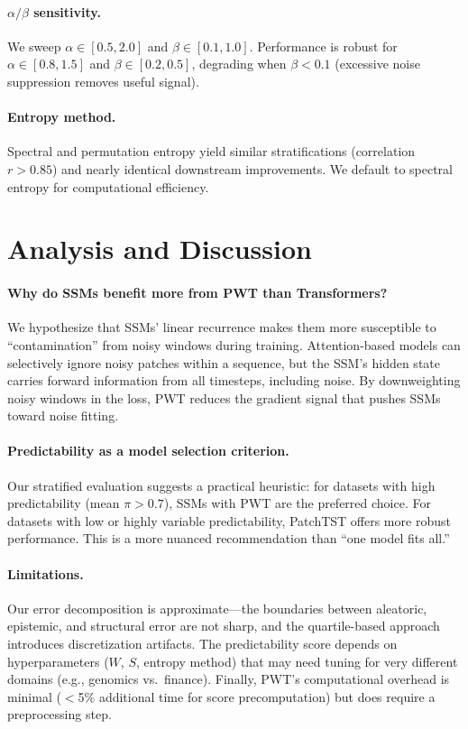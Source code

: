 \documentclass[10pt]{article}
\newcommand{\pwt}{\textsc{PWT}}
\newcommand{\predscore}{\pi}
\begin{document}
\paragraph{$\alpha/\beta$ sensitivity.} We sweep $\alpha \in [0.5, 2.0]$ and $\beta \in [0.1, 1.0]$. Performance is robust for $\alpha \in [0.8, 1.5]$ and $\beta \in [0.2, 0.5]$, degrading when $\beta < 0.1$ (excessive noise suppression removes useful signal).

\paragraph{Entropy method.} Spectral and permutation entropy yield similar stratifications (correlation $r > 0.85$) and nearly identical downstream improvements. We default to spectral entropy for computational efficiency.

\section{Analysis and Discussion}
\label{sec:discussion}

\paragraph{Why do SSMs benefit more from \pwt{} than Transformers?}
We hypothesize that SSMs' linear recurrence makes them more susceptible to ``contamination'' from noisy windows during training. Attention-based models can selectively ignore noisy patches within a sequence, but the SSM's hidden state carries forward information from all timesteps, including noise. By downweighting noisy windows in the loss, \pwt{} reduces the gradient signal that pushes SSMs toward noise fitting.

\paragraph{Predictability as a model selection criterion.}
Our stratified evaluation suggests a practical heuristic: for datasets with high predictability (mean $\predscore > 0.7$), SSMs with \pwt{} are the preferred choice. For datasets with low or highly variable predictability, PatchTST offers more robust performance. This is a more nuanced recommendation than ``one model fits all.''

\paragraph{Limitations.}
Our error decomposition is approximate---the boundaries between aleatoric, epistemic, and structural error are not sharp, and the quartile-based approach introduces discretization artifacts. The predictability score depends on hyperparameters ($W$, $S$, entropy method) that may need tuning for very different domains (e.g., genomics vs.\ finance). Finally, \pwt{}'s computational overhead is minimal ($<$5\% additional time for score precomputation) but does require a preprocessing step.
\end{document}
